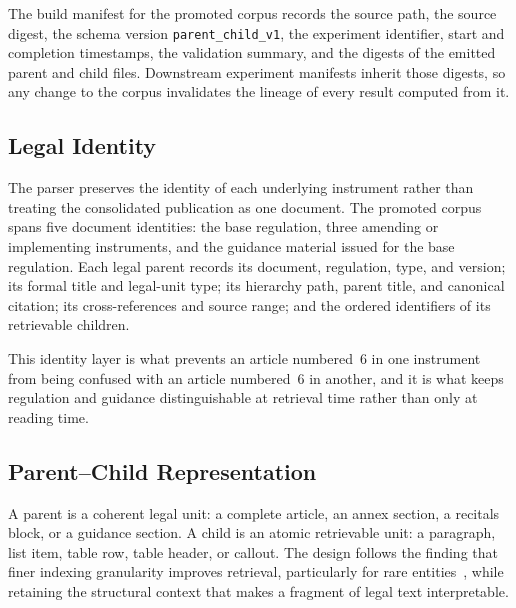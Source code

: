 
The build manifest for the promoted corpus records the source path, the source digest, the schema version \texttt{parent\_child\_v1}, the experiment identifier, start and completion timestamps, the validation summary, and the digests of the emitted parent and child files. Downstream experiment manifests inherit those digests, so any change to the corpus invalidates the lineage of every result computed from it.

\subsection{Legal Identity}

The parser preserves the identity of each underlying instrument rather than treating the consolidated publication as one document. The promoted corpus spans five document identities: the base regulation, three amending or implementing instruments, and the guidance material issued for the base regulation. Each legal parent records its document, regulation, type, and version; its formal title and legal-unit type; its hierarchy path, parent title, and canonical citation; its cross-references and source range; and the ordered identifiers of its retrievable children.

This identity layer is what prevents an article numbered~6 in one instrument from being confused with an article numbered~6 in another, and it is what keeps regulation and guidance distinguishable at retrieval time rather than only at reading time.

\subsection{Parent--Child Representation}

A parent is a coherent legal unit: a complete article, an annex section, a recitals block, or a guidance section. A child is an atomic retrievable unit: a paragraph, list item, table row, table header, or callout. The design follows the finding that finer indexing granularity improves retrieval, particularly for rare entities~\cite{chen2024densex}, while retaining the structural context that makes a fragment of legal text interpretable.

